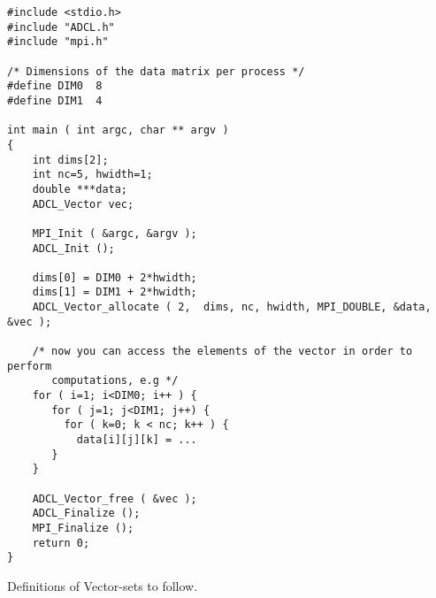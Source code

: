 \begin{verbatim}
#include <stdio.h>
#include "ADCL.h"
#include "mpi.h"

/* Dimensions of the data matrix per process */
#define DIM0  8
#define DIM1  4

int main ( int argc, char ** argv ) 
{
    int dims[2];
    int nc=5, hwidth=1;
    double ***data;
    ADCL_Vector vec;
    
    MPI_Init ( &argc, &argv );
    ADCL_Init ();
    
    dims[0] = DIM0 + 2*hwidth;
    dims[1] = DIM1 + 2*hwidth;
    ADCL_Vector_allocate ( 2,  dims, nc, hwidth, MPI_DOUBLE, &data, &vec );
    
    /* now you can access the elements of the vector in order to perform 
       computations, e.g */
    for ( i=1; i<DIM0; i++ ) {
       for ( j=1; j<DIM1; j++) {
         for ( k=0; k < nc; k++ ) {
           data[i][j][k] = ...
       }
    }
    
    ADCL_Vector_free ( &vec );        
    ADCL_Finalize ();
    MPI_Finalize ();
    return 0;
}
\end{verbatim}

Definitions of Vector-sets to follow.